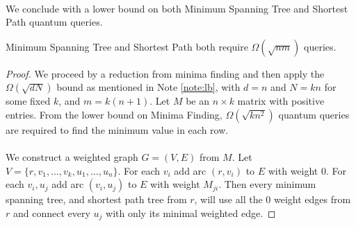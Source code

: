\paragraph{}
We conclude with a lower bound on both Minimum Spanning Tree and Shortest Path quantum queries.
\begin{theorem}
Minimum Spanning Tree and Shortest Path both require $\Omega(\sqrt{nm})$ queries.
\end{theorem}
\begin{proof}
We proceed by a reduction from minima finding and then apply the $\Omega(\sqrt{dN})$ bound as mentioned in Note \ref{note:lb}, with $d = n$ and $N= kn$ for some fixed $k$, and $m = k(n+1)$. Let $M$ be an $n\times k$ matrix with positive entries. From the lower bound on Minima Finding, $\Omega(\sqrt{kn^2})$ quantum queries are required to find the minimum value in each row.
\paragraph{}
We construct a weighted graph $G=(V,E)$ from $M$. Let $V = \{r, v_1, \dots, v_k, u_1, \dots, u_n\}$. For each $v_i$ add arc $(r,v_i)$ to $E$ with weight $0$. For each $v_i, u_j$ add arc $(v_i, u_j)$ to $E$ with weight $M_{ji}$. Then every minimum spanning tree, and shortest path tree from $r$, will use all the $0$ weight edges from $r$ and connect every $u_j$ with only its minimal weighted edge.
\end{proof}